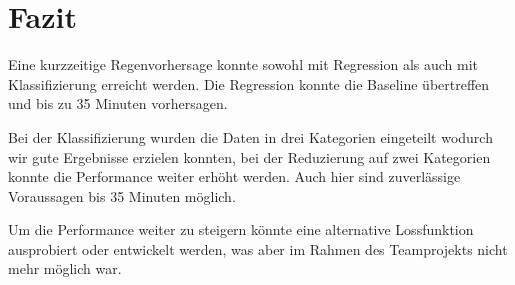 \newpage
\section{Fazit}
Eine kurzzeitige Regenvorhersage konnte sowohl mit Regression als auch mit Klassifizierung erreicht werden. Die Regression konnte die Baseline übertreffen und bis zu 35 Minuten vorhersagen.

Bei der Klassifizierung wurden die Daten in drei Kategorien eingeteilt wodurch wir gute Ergebnisse erzielen konnten, bei der Reduzierung auf zwei Kategorien konnte die Performance weiter erhöht werden. Auch hier sind zuverlässige Voraussagen bis 35 Minuten möglich.

Um die Performance weiter zu steigern könnte eine alternative Lossfunktion ausprobiert oder entwickelt werden, was aber im Rahmen des Teamprojekts nicht mehr möglich war.
